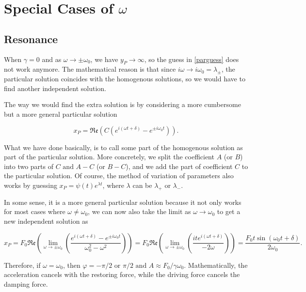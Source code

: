 \documentclass[english,a4paper,12pt]{report}
\begin{document}
\section{Special Cases of \(\omega \) }

\subsection{Resonance}

When \(\gamma = 0\) and as \(\omega \to \pm \omega _{0}\), we have \(y_{P} \to \infty  \), so the guess in \cref{parguess} does not work anymore. The mathematical reason is that since \(i \omega \to  i \omega _{0} = \lambda _{\pm } \), the particular solution coincides with the homogenous solutions, so we would have to find another independent solution. 

The way we would find the extra solution is by considering a more cumbersome but a more general particular solution 

\begin{equation}
    x_{P} =  \mathfrak{Re} (C(e^{i(\omega t+\delta )} - e^{\pm i\omega _{0}t  } ) ). 
\end{equation}

What we have done basically, is to call some part of the homogenous solution as part of the particular solution. More concretely, we split the coefficient \(A \) (or \(B\)) into two parts of \(C \text { and } A-C\) (or \(B-C\)), and we add the part of coefficient \(C\) to the particular solution. Of course, the method of variation of parameters also works by guessing \(x_{P} = \psi (t)e^{\lambda t}\), where \(\lambda \) can be \(\lambda _{+} \text { or } \lambda _{-}  \).

In some sense, it is a more general particular solution because it not only works for most cases where \(\omega \neq \omega _{0} \), we can now also take the limit as \(\omega \to \omega _{0} \) to get a new independent solution as   


\begin{equation}
    x_{P} = F_0 \mathfrak{Re} \left( \lim_{\omega  \to \pm \omega _{0}  } \left(  \frac{e^{i (\omega t+\delta )} - e^{\pm i \omega _{0}  t }  }{\omega _{0}^2-\omega ^2 } \right)\right) = F_0 \mathfrak{Re} \left( \lim_{\omega  \to \pm \omega _{0} } \left(\frac{ite^{i (\omega t+\delta )} }{-2\omega } \right) \right)= \frac{F_0 t \sin (\omega _{0}t +\delta )}{2 \omega _{0} }.
\end{equation}

Therefore, if \(\omega = \omega _{0} \), then \( \varphi = - \pi /2 \text { or } \pi /2 \text { and } A\approx F_0 /\gamma \omega _{0}   \). Mathematically, the acceleration cancels with the restoring force, while the driving force cancels the damping force.
\end{document}
